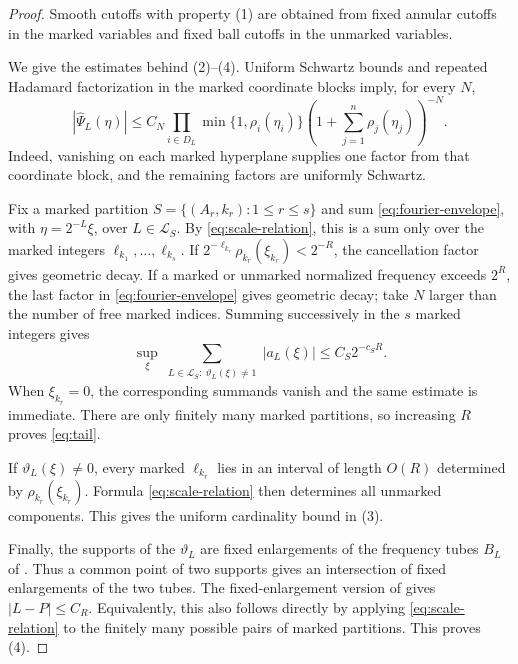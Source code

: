 \documentclass[11pt]{article}
\newcommand{\cL}{\mathcal L}
\begin{document}
\begin{proof}
Smooth cutoffs with property (1) are obtained from fixed annular cutoffs in
the marked variables and fixed ball cutoffs in the unmarked variables.

We give the estimates behind (2)--(4).  Uniform Schwartz bounds and repeated
Hadamard factorization in the marked coordinate blocks imply, for every $N$,
\begin{equation}\label{eq:fourier-envelope}
 |\widehat\Psi_L(\eta)|
 \le C_N
 \prod_{i\in D_L}\min\{1,\rho_i(\eta_i)\}
 \left(1+\sum_{j=1}^n\rho_j(\eta_j)\right)^{-N}.
\end{equation}
Indeed, vanishing on each marked hyperplane supplies one factor from that
coordinate block, and the remaining factors are uniformly Schwartz.

Fix a marked partition $S=\{(A_r,k_r):1\le r\le s\}$ and sum
\eqref{eq:fourier-envelope}, with $\eta=2^{-L}\xi$, over
$L\in\cL_S$.  By \eqref{eq:scale-relation}, this is a sum only over the
marked integers $\ell_{k_1},\ldots,\ell_{k_s}$.  If
$2^{-\ell_{k_r}}\rho_{k_r}(\xi_{k_r})<2^{-R}$, the cancellation factor gives
geometric decay.  If a marked or unmarked normalized frequency exceeds
$2^R$, the last factor in \eqref{eq:fourier-envelope} gives geometric decay;
take $N$ larger than the number of free marked indices.  Summing successively
in the $s$ marked integers gives
\[
 \sup_{\xi}\sum_{\substack{L\in\cL_S:\
             \vartheta_L(\xi)\ne1}}|a_L(\xi)|
 \le C_S2^{-c_SR}.
\]
When $\xi_{k_r}=0$, the corresponding summands vanish and the same estimate
is immediate.  There are only finitely many marked partitions, so increasing
$R$ proves \eqref{eq:tail}.

If $\vartheta_L(\xi)\ne0$, every marked $\ell_{k_r}$ lies in an interval of
length $O(R)$ determined by $\rho_{k_r}(\xi_{k_r})$.  Formula
\eqref{eq:scale-relation} then determines all unmarked components.  This gives
the uniform cardinality bound in (3).

Finally, the supports of the $\vartheta_L$ are fixed enlargements of the
frequency tubes $B_L$ of \cite[Section 3.4]{HNR}.  Thus a common point of two
supports gives an intersection of fixed enlargements of the two tubes.  The
fixed-enlargement version of \cite[Lemma 3.8(iv)]{HNR} gives
$|L-P|\le C_R$.  Equivalently, this also follows directly by applying
\eqref{eq:scale-relation} to the finitely many possible pairs of marked
partitions.  This proves (4).
\end{proof}
\end{document}
